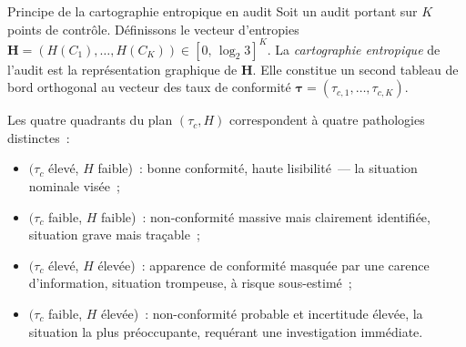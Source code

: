 \begin{boiteTheoreme}{Principe de la cartographie entropique en audit}
Soit un audit portant sur $K$ points de contrôle. Définissons le vecteur
d'entropies $\mathbf{H} = (H(C_1), \ldots, H(C_K)) \in [0,\,\log_2 3]^K$.
La \emph{cartographie entropique} de l'audit est la représentation graphique de
$\mathbf{H}$. Elle constitue un second tableau de bord orthogonal au vecteur des
taux de conformité $\boldsymbol{\tau} = (\tau_{c,1}, \ldots, \tau_{c,K})$.

Les quatre quadrants du plan $(\tau_c, H)$ correspondent à quatre pathologies
distinctes~:
\begin{itemize}
  \item $(\tau_c$ élevé, $H$ faible)~: bonne conformité, haute lisibilité~---
        la situation nominale visée~;
  \item $(\tau_c$ faible, $H$ faible)~: non-conformité massive mais clairement
        identifiée, situation grave mais traçable~;
  \item $(\tau_c$ élevé, $H$ élevée)~: apparence de conformité masquée par une
        carence d'information, situation trompeuse, à risque sous-estimé~;
  \item $(\tau_c$ faible, $H$ élevée)~: non-conformité probable et incertitude
        élevée, la situation la plus préoccupante, requérant une investigation
        immédiate.
\end{itemize}
\end{boiteTheoreme}

